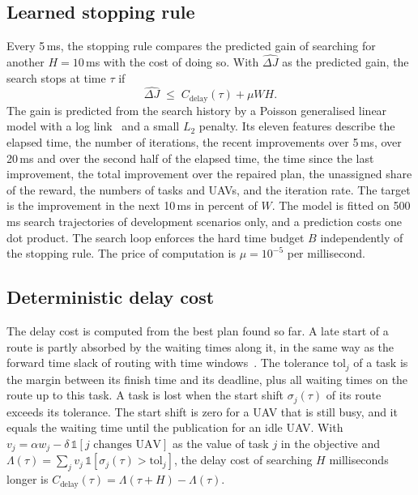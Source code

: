 \subsection{Learned stopping rule}
Every 5\,ms, the stopping rule compares the predicted gain of searching for another $H=10$\,ms with the cost of doing so.
With $\widehat{\Delta J}$ as the predicted gain, the search stops at time $\tau$ if
\begin{equation}\label{eq:Sstop}
\widehat{\Delta J}\;\le\;C_{\mathrm{delay}}(\tau)+\mu W H .
\end{equation}
The gain is predicted from the search history by a Poisson generalised linear model with a log
link~\cite{mccullagh1989glm} and a small $L_2$ penalty. Its eleven features describe the elapsed time, the number of
iterations, the recent improvements over 5\,ms, over 20\,ms and over the second half of the elapsed time, the time since
the last improvement, the total improvement over the repaired plan, the unassigned share of the reward, the numbers of
tasks and UAVs, and the iteration rate. The target is the improvement in the next 10\,ms in percent of $W$. The model is
fitted on 500\,ms search trajectories of development scenarios only, and a prediction costs one dot product. The search
loop enforces the hard time budget $B$ independently of the stopping rule. The price of computation is
$\mu=10^{-5}$ per millisecond.

\subsection{Deterministic delay cost}
The delay cost is computed from the best plan found so far. A late start of a route is partly absorbed by the waiting
times along it, in the same way as the forward time slack of routing with time windows~\cite{savelsbergh1992vrptw}. The
tolerance $\mathrm{tol}_j$ of a task is the margin between its finish time and its deadline, plus all waiting times on
the route up to this task. A task is lost when the start shift $\sigma_j(\tau)$ of its route exceeds its tolerance. The
start shift is zero for a UAV that is still busy, and it equals the waiting time until the publication for an idle UAV.
With $v_j=\alpha w_j-\delta\,\mathbb{1}[\text{$j$ changes UAV}]$ as the value of task $j$ in the objective and
$\Lambda(\tau)=\sum_j v_j\,\mathbb{1}[\sigma_j(\tau)>\mathrm{tol}_j]$, the delay cost of searching $H$ milliseconds longer
is $C_{\mathrm{delay}}(\tau)=\Lambda(\tau+H)-\Lambda(\tau)$.

